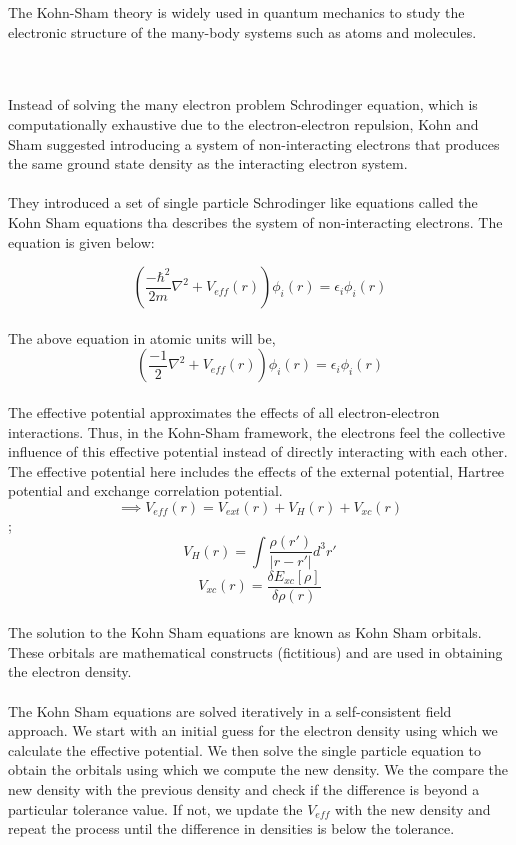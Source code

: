 \documentclass[12pt]{article}
\begin{document}
The Kohn-Sham theory is widely used in quantum mechanics to study the electronic structure of the many-body 
systems such as atoms and molecules. 

\\
\\
Instead of solving the many electron problem Schrodinger equation, which is computationally exhaustive due to 
the electron-electron repulsion, Kohn and Sham suggested introducing a system of non-interacting electrons that
 produces the same ground state density as the interacting electron system. 
\\
\\
They introduced a set of single particle Schrodinger like equations called the Kohn Sham equations tha describes 
the system of non-interacting electrons. The equation is given below:

\[ (\frac{-\hbar^2}{2m}\nabla^2 + V_{eff}(r))\phi_i(r) = \epsilon_i \phi_i(r)\]
\\
The above equation in atomic units will be,
\[ (\frac{-1}{2}\nabla^2 + V_{eff}(r))\phi_i(r) = \epsilon_i \phi_i(r)\]
\\
The effective potential approximates the effects of all electron-electron interactions. Thus, in the Kohn-Sham framework, 
the electrons feel the collective influence of this effective potential instead of directly interacting with each other. 
The effective potential here includes the effects of the external potential, Hartree potential and exchange correlation potential.   
\[ \implies V_{eff}(r) = V_{ext}(r) + V_H(r) + V_{xc}(r)\] ;
\[ V_H(r) = \int \frac{\rho(r')}{|r-r'|}d^3r'\]
\[ V_{xc}(r) = \frac{\delta E_{xc}[\rho]}{\delta \rho(r)}\]
\\
The solution to the Kohn Sham equations are known as Kohn Sham orbitals. These orbitals are mathematical 
constructs (fictitious) and are used in obtaining the electron density. 
\\
\\
The Kohn Sham equations are solved iteratively in a self-consistent field approach. We start with an initial 
guess for the electron density using which we calculate the effective potential. We then solve the single particle
equation to obtain the orbitals using which we compute the new density. We the compare the new density with the previous 
density and check if the difference is beyond a particular tolerance value. If not, we update the $V_{eff}$ with 
the new density and repeat the process until the difference in densities is below the tolerance.
\end{document}
